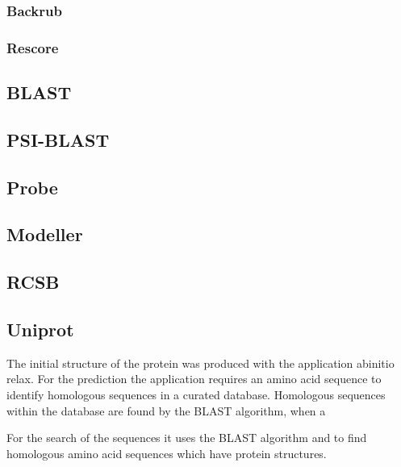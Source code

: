 \subsubsection{Backrub}
\label{subsubsec:MM_Backrub}

\subsubsection{Rescore}
\label{subsubsec:MM_Rescore}

\label{subsec:MM_Rosetta}

\subsection{BLAST}
\label{subsec:MM_BLAST}

\subsection{PSI-BLAST}
\label{subsec:MM_PSI_BLAST}


\subsection{Probe}
\label{subsec:MM_Probe}

\subsection{Modeller}
\label{subsec:MM_Modeller}

\subsection{RCSB}
\label{subsec:MM_RCSB}

\subsection{Uniprot}
\label{subsec:MM_Uniprot}




 The initial structure of the protein was produced with the application abinitio relax. For the prediction the application requires an amino acid sequence to identify homologous sequences in a curated database. Homologous sequences within the database are found by the BLAST algorithm, when a

For the search of the sequences it uses the BLAST algorithm and to find homologous amino acid sequences which have protein structures.

